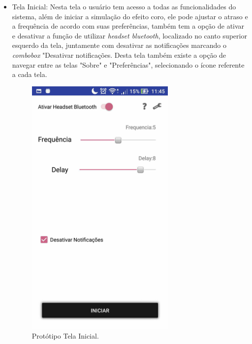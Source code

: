 \begin{itemize}
	\item Tela Inicial: Nesta tela o usu\'ario tem acesso a todas as funcionalidades do sistema, al\'em de iniciar a simula\c{c}\~ao do efeito coro, ele pode ajustar o atraso e a frequ\^encia de acordo com suas prefer\^encias, tamb\'em tem a op\c{c}\~ao de ativar e desativar a fun\c{c}\~ao de utilizar \textit{headset bluetooth}, localizado no canto superior esquerdo da tela, juntamente com desativar as notifica\c{c}\~oes marcando o \textit{combobox} "Desativar notifica\c{c}\~oes. Desta tela tamb\'em existe a op\c{c}\~ao de navegar entre as telas "Sobre" e "Prefer\^encias", selecionando o \'icone referente a cada tela.
	\begin{figure}[H]
		\centering
		\caption[Prot\'otipo Tela Inicial]{Prot\'otipo Tela Inicial. \label{fig:prototipotelainicial}}
		\includegraphics[height=13cm]{./Figuras/prototipo_telainicial.jpg}%
	\end{figure}
	

\end{itemize}
